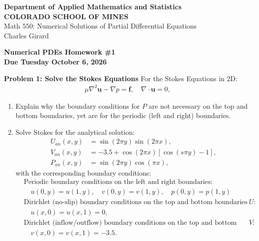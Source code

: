 \documentclass[12pt]{article}
\begin{document}
\begin{flushleft}
    \textbf{Department of Applied Mathematics and Statistics} \\
    \textbf{COLORADO SCHOOL OF MINES} \\
    Math $550$: Numerical Solutions of Partial Differential Equations \\
    Charles Girard

\end{flushleft}


\begin{center}
\bf{Numerical PDEs Homework \#1}\\
\bf{Due Tuesday October 6, 2026}
\end{center}

\vspace{0.3cm}

\noindent \textbf{Problem 1: Solve the Stokes Equations}
For the Stokes Equations in 2D:
$$
\begin{aligned}
    \mu \nabla^2 \mathbf{u} - \nabla p = \mathbf{f}, \quad \nabla \cdot \mathbf{u} = 0,
\end{aligned}
$$
\begin{enumerate}[label = (\alph*)]
    \item Explain why the boundary conditions for $P$ are not necessary on the top and bottom boundaries, yet are for the periodic (left and right) boundaries.
    \item Solve Stokes for the analytical solution:
        $$ \begin{aligned}
            U_{an}(x,y) &= \sin(2\pi y) \sin(2 \pi x), \\
            V_{an}(x,y) &= -3.5 + \cos(2\pi x)\left[ \cos(s\pi y) - 1 \right], \\
            P_{an}(x,y) &= \sin(2\pi y) \cos(\pi x), 
        \end{aligned} $$
        with the corresponding boundary conditions:
        $$  \begin{aligned}
            &\text{Periodic boundary conditions on the left and right boundaries: }\\ &\quad u(0,y) = u(1,y), \quad v(0,y) = v(1,y), \quad p(0,y) = p(1,y) \\
            &\text{Dirichlet (no-slip) boundary conditions on the top and bottom boundaries for $U$: } \\ &\quad u(x,0) = u(x,1) = 0, \\
            &\text{Dirichlet (inflow/outflow) boundary conditions on the top and bottom boundaries for $V$: } \\ &\quad v(x,0) = v(x,1) = -3.5.
        \end{aligned} $$
\end{enumerate}
\end{document}
